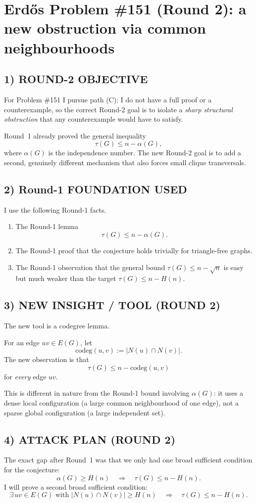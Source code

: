
\section{Erd\H{o}s Problem \#151 (Round 2): a new obstruction via common neighbourhoods}

\subsection*{1) ROUND-2 OBJECTIVE}
For Problem \#151 I pursue path (C): I do not have a full proof or a counterexample, so the correct Round-2 goal is to isolate a \emph{sharp structural obstruction} that any counterexample would have to satisfy.

Round~1 already proved the general inequality
\[
\tau(G)\le n-\alpha(G),
\]
where $\alpha(G)$ is the independence number. The new Round-2 goal is to add a second, genuinely different mechanism that also forces small clique transversals.

\subsection*{2) Round-1 FOUNDATION USED}
I use the following Round-1 facts.

\begin{enumerate}
\item The Round-1 lemma
\[
\tau(G)\le n-\alpha(G).
\]
\item The Round-1 proof that the conjecture holds trivially for triangle-free graphs.
\item The Round-1 observation that the general bound $\tau(G)\le n-\sqrt n$ is easy but much weaker than the target $\tau(G)\le n-H(n)$.
\end{enumerate}

\subsection*{3) NEW INSIGHT / TOOL (ROUND 2)}
The new tool is a codegree lemma.

For an edge $uv\in E(G)$, let
\[
\mathrm{codeg}(u,v):=|N(u)\cap N(v)|.
\]
The new observation is that
\[
\tau(G)\le n-\mathrm{codeg}(u,v)
\]
for \emph{every} edge $uv$.

This is different in nature from the Round-1 bound involving $\alpha(G)$: it uses a dense local configuration (a large common neighbourhood of one edge), not a sparse global configuration (a large independent set).

\subsection*{4) ATTACK PLAN (ROUND 2)}
The exact gap after Round~1 was that we only had one broad sufficient condition for the conjecture:
\[
\alpha(G)\ge H(n)\quad\Longrightarrow\quad \tau(G)\le n-H(n).
\]
I will prove a second broad sufficient condition:
\[
\exists\, uv\in E(G)\mbox{ with }|N(u)\cap N(v)|\ge H(n)
\quad\Longrightarrow\quad
\tau(G)\le n-H(n).
\]

